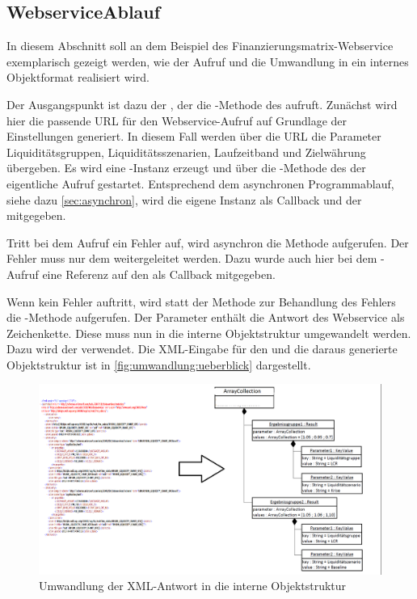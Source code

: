 \begin{onehalfspacing}
\subsection{WebserviceAblauf}
In diesem Abschnitt soll an dem Beispiel des Finanzierungsmatrix-Webservice exemplarisch gezeigt werden, wie der Aufruf und die Umwandlung in ein internes Objektformat realisiert wird.

Der Ausgangspunkt ist dazu der , der die -Methode des  aufruft. Zunächst wird hier die passende URL für den Webservice-Aufruf auf Grundlage der Einstellungen generiert. In diesem Fall werden über die URL die Parameter Liquiditätsgruppen, Liquiditätsszenarien, Laufzeitband und Zielwährung übergeben. Es wird eine -Instanz erzeugt und über die -Methode des  der eigentliche Aufruf gestartet. Entsprechend dem asynchronen Programmablauf, siehe dazu \vref{sec:asynchron}, wird die eigene Instanz als Callback und der  mitgegeben.

Tritt bei dem Aufruf ein Fehler auf, wird asynchron die Methode  aufgerufen. Der Fehler muss nur dem  weitergeleitet werden. Dazu wurde auch hier bei dem -Aufruf eine Referenz auf den  als Callback mitgegeben.

Wenn kein Fehler auftritt, wird statt der Methode zur Behandlung des Fehlers die -Methode aufgerufen. Der Parameter  enthält die Antwort des Webservice als Zeichenkette. Diese muss nun in die interne Objektstruktur umgewandelt werden. Dazu wird der   verwendet. Die \gls{XML}-Eingabe für den  und die daraus generierte Objektstruktur ist in \vref{fig:umwandlung:ueberblick} dargestellt.

\begin{figure}[h]
\centering
\setlength{\unitlength}{1mm}
\includegraphics[width=15cm]{images/umwandlung.png}
\caption{Umwandlung der XML-Antwort in die interne Objektstruktur\label{fig:umwandlung:ueberblick}}
\end{figure}


\end{onehalfspacing}
